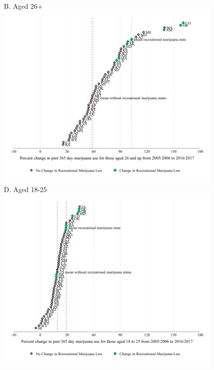 \documentclass[12pt]{article}%
\begin{document}
\begin{figure}[H]
\begin{minipage}{\linewidth}
\begin{minipage}{.49\linewidth}
        \end{minipage}
        ~
        \begin{minipage}{.49\linewidth}
          B. Aged 26+\\
          \includegraphics[width=\linewidth]{../output/plots/panel_per_diff_mj_use_365_26.pdf}
          D. Aged 18-25 \\
          \includegraphics[width=\linewidth]{../output/plots/panel_per_diff_mj_use_365_18_25.pdf}
        \end{minipage}
    \end{minipage}
        \label{fig:mj-use-all-ages}
\end{figure}
   
\end{document}
